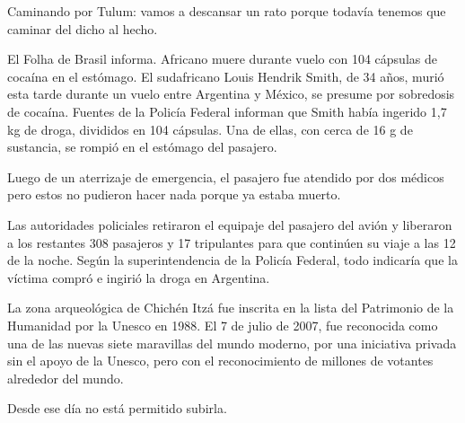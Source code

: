 \documentclass[12pt,twoside,openright,a5paper]{book}
\begin{document}
Caminando por Tulum: vamos a descansar un rato porque todavía tenemos que
caminar del dicho al hecho.

\vspace{0.5cm}

\hrulefill\hspace{0.2cm} \decofourleft\decofourright \hspace{0.2cm} \hrulefill
\vspace{0.5cm}

El Folha de Brasil informa. Africano muere
durante vuelo con 104 cápsulas de cocaína en el estómago.  El sudafricano
Louis Hendrik Smith, de 34 años, murió esta tarde durante un vuelo entre
Argentina y México, se presume por sobredosis de cocaína. Fuentes de
la Policía Federal informan que Smith había ingerido 1,7 kg de droga,
divididos en 104 cápsulas. Una de ellas, con cerca de 16 g de sustancia,
se rompió en el estómago del pasajero.

Luego de un aterrizaje de emergencia, el pasajero fue atendido por dos
médicos pero estos no pudieron hacer nada porque ya estaba muerto.

Las autoridades policiales retiraron el equipaje del pasajero del avión y
liberaron a los restantes 308 pasajeros y 17 tripulantes para que continúen
su viaje a las 12 de la noche.  Según la superintendencia de la Policía
Federal, todo indicaría que la víctima compró e ingirió la droga en
Argentina.

\vspace{0.5cm}

\hrulefill\hspace{0.2cm} \decofourleft\decofourright \hspace{0.2cm} \hrulefill
\vspace{0.5cm}

La zona arqueológica de Chichén Itzá fue inscrita en la lista del
Patrimonio de la Humanidad por la Unesco en 1988. El 7 de julio de 2007, fue
reconocida como una de las nuevas siete maravillas del mundo moderno, por
una iniciativa privada sin el apoyo de la Unesco, pero con el reconocimiento
de millones de votantes alrededor del mundo.

Desde ese día no está permitido subirla.

\vspace{0.5cm}
\afterpage{}
\hrulefill\hspace{0.2cm} \decofourleft\decofourright \hspace{0.2cm} \hrulefill
\vspace{0.5cm}
\end{document}
